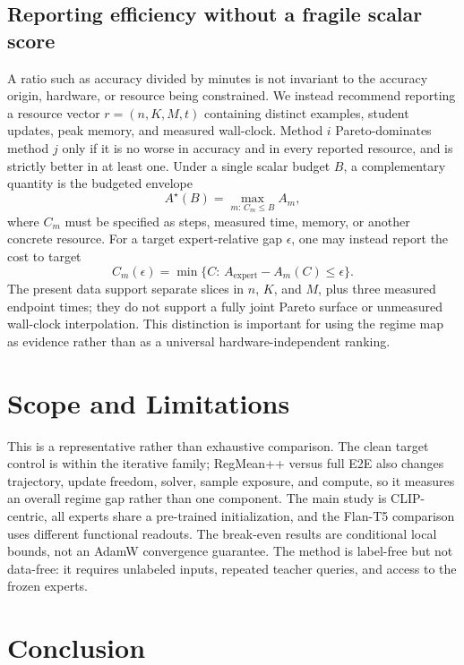 \documentclass[letterpaper]{article} %
\theoremstyle{plain}
\theoremstyle{definition}
\begin{document}
\subsection{Reporting efficiency without a fragile scalar score}
\label{sec:efficiency-metrics}
A ratio such as accuracy divided by minutes is not invariant to the accuracy origin, hardware, or resource being constrained.
We instead recommend reporting a resource vector $r=(n,K,M,t)$ containing distinct examples, student updates, peak memory, and measured wall-clock.
Method $i$ Pareto-dominates method $j$ only if it is no worse in accuracy and in every reported resource, and is strictly better in at least one.
Under a single scalar budget $B$, a complementary quantity is the budgeted envelope
\begin{equation}
A^\star(B)=\max_{m:\,C_m\le B} A_m,
\label{eq:budget-envelope-main}
\end{equation}
where $C_m$ must be specified as steps, measured time, memory, or another concrete resource.
For a target expert-relative gap $\epsilon$, one may instead report the cost to target
\begin{equation}
C_m(\epsilon)=\min\{C:\,A_{\mathrm{expert}}-A_m(C)\le\epsilon\}.
\label{eq:cost-target-main}
\end{equation}
The present data support separate slices in $n$, $K$, and $M$, plus three measured endpoint times; they do not support a fully joint Pareto surface or unmeasured wall-clock interpolation.
This distinction is important for using the regime map as evidence rather than as a universal hardware-independent ranking.

\section{Scope and Limitations}
\label{sec:limitations-main}
This is a representative rather than exhaustive comparison.
The clean target control is within the iterative family; RegMean++ versus full E2E also changes trajectory, update freedom, solver, sample exposure, and compute, so it measures an overall regime gap rather than one component.
The main study is CLIP-centric, all experts share a pre-trained initialization, and the Flan-T5 comparison uses different functional readouts.
The break-even results are conditional local bounds, not an AdamW convergence guarantee.
The method is label-free but not data-free: it requires unlabeled inputs, repeated teacher queries, and access to the frozen experts.

\section{Conclusion}
\label{sec:conclusion}
\end{document}
